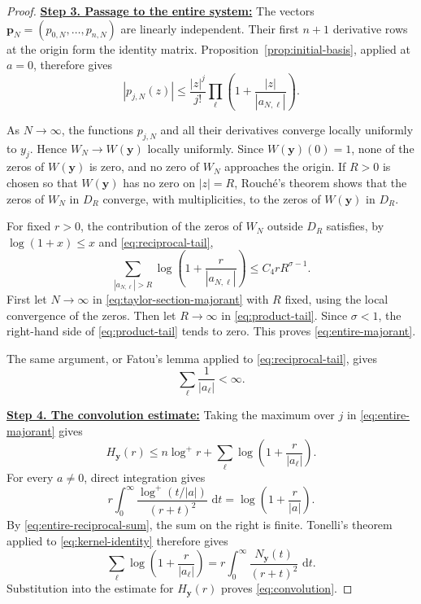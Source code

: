 \documentclass[12pt,letterpaper,reqno]{amsart}
\theoremstyle{definition}
\numberwithin{equation}{section}
\newcommand{\dd}{\,\mathrm d}
\newcommand{\pv}{\bm p}
\newcommand{\yv}{\bm y}
\begin{document}
\begin{proof}
\medskip\noindent
\textbf{\underline{Step 3. Passage to the entire system:}}
The vectors \(\pv_N=(p_{0,N},\ldots,p_{n,N})\) are linearly
independent. Their first \(n+1\) derivative rows at the origin form the
identity matrix. Proposition~\ref{prop:initial-basis}, applied at
\(a=0\), therefore gives
\begin{equation}\label{eq:taylor-section-majorant}
 |p_{j,N}(z)|
 \leq
 \frac{|z|^j}{j!}
 \prod_\ell
 \left(1+\frac{|z|}{|a_{N,\ell}|}\right).
\end{equation}

As \(N\to\infty\), the functions \(p_{j,N}\) and all their derivatives
converge locally uniformly to \(y_j\). Hence \(W_N\to W(\yv)\) locally uniformly. Since \(W(\yv)(0)=1\), none of the zeros of \(W(\yv)\) is zero, and no zero of \(W_N\) approaches the origin. If \(R>0\) is chosen so that
\(W(\yv)\) has no zero on \(|z|=R\), Rouch\'e's theorem shows that the
zeros of \(W_N\) in \(D_R\) converge, with multiplicities, to the zeros
of \(W(\yv)\) in \(D_R\).

For fixed \(r>0\), the contribution of the zeros of \(W_N\) outside
\(D_R\) satisfies, by \(\log(1+x)\leq x\) and
\eqref{eq:reciprocal-tail},
\begin{equation}\label{eq:product-tail}
 \sum_{|a_{N,\ell}|>R}
 \log\left(1+\frac{r}{|a_{N,\ell}|}\right)
 \leq
 C_4rR^{\sigma-1}.
\end{equation}
First let \(N\to\infty\) in \eqref{eq:taylor-section-majorant} with
\(R\) fixed, using the local convergence of the zeros. Then let
\(R\to\infty\) in \eqref{eq:product-tail}. Since \(\sigma<1\), the
right-hand side of \eqref{eq:product-tail} tends to zero. This proves
\eqref{eq:entire-majorant}.

The same argument, or Fatou's lemma applied to
\eqref{eq:reciprocal-tail}, gives
\begin{equation}\label{eq:entire-reciprocal-sum}
 \sum_\ell\frac1{|a_\ell|}<\infty.
\end{equation}


\medskip\noindent
\textbf{\underline{Step 4. The convolution estimate:}}
Taking the maximum over \(j\) in \eqref{eq:entire-majorant} gives
\[
 H_{\yv}(r)
 \leq
 n\log^+r
 +
 \sum_\ell
 \log\left(1+\frac{r}{|a_\ell|}\right).
\]
For every \(a\ne0\), direct integration gives
\begin{equation}\label{eq:kernel-identity}
 r\int_0^\infty
 \frac{\log^+(t/|a|)}{(r+t)^2}\,\dd t
 =
 \log\left(1+\frac r{|a|}\right).
\end{equation}
By \eqref{eq:entire-reciprocal-sum}, the sum on the right is finite.
Tonelli's theorem \cite[Theorem~2.37(a), p.~67]{Fol99} applied to
\eqref{eq:kernel-identity} therefore gives
\[
 \sum_\ell
 \log\left(1+\frac r{|a_\ell|}\right)
 =
 r\int_0^\infty
 \frac{N_{\yv}(t)}{(r+t)^2}\,\dd t.
\]
Substitution into the estimate for \(H_{\yv}(r)\) proves
\eqref{eq:convolution}.
\end{proof}
\end{document}
